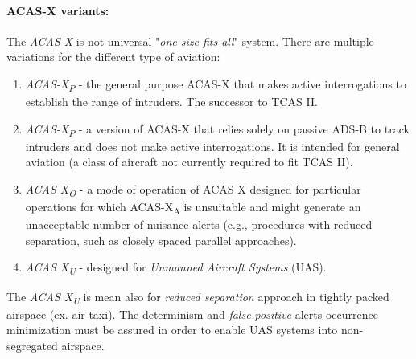 \paragraph{ACAS-X variants:} The \emph{ACAS-X} is not universal "\emph{one-size fits all}" system. There are multiple variations for the different type of aviation:
\begin{enumerate}
    \item \emph{ACAS-X\textsubscript{P}} - the general purpose ACAS-X that makes active interrogations to establish the range of intruders. The successor to TCAS II.
    
    \item \emph{ACAS-X\textsubscript{P}} - a version of ACAS-X that relies solely on passive ADS-B to track intruders and does not make active interrogations. It is intended for general aviation (a class of aircraft not currently required to fit TCAS II).
    
    \item \emph{ACAS X\textsubscript{O}} - a mode of operation of ACAS X designed for particular operations for which ACAS-X\textsubscript{A} is unsuitable and might generate an unacceptable number of nuisance alerts (e.g., procedures with reduced separation, such as closely spaced parallel approaches).
    
    \item \emph{ACAS X\textsubscript{U}} - designed for \emph{Unmanned Aircraft Systems} (UAS).
\end{enumerate}

\begin{note}
    The \emph{ACAS X\textsubscript{U}} is mean also for \emph{reduced separation} approach in tightly packed airspace (ex. air-taxi). The determinism and \emph{false-positive} alerts occurrence minimization must be assured in order to enable UAS systems into non-segregated airspace.
\end{note}

